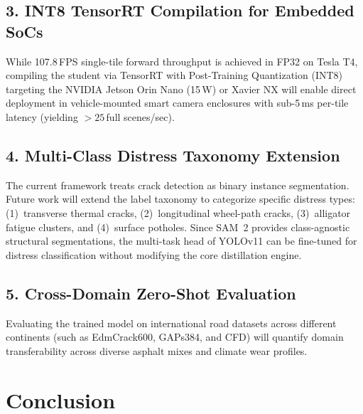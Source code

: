 \documentclass[11pt,a4paper]{article}
\begin{document}
\subsection{3. INT8 TensorRT Compilation for Embedded SoCs}
While 107.8\,FPS single-tile forward throughput is achieved in FP32 on Tesla T4, compiling the student via TensorRT with Post-Training Quantization (INT8) targeting the NVIDIA Jetson Orin Nano (15\,W) or Xavier NX will enable direct deployment in vehicle-mounted smart camera enclosures with sub-5\,ms per-tile latency (yielding $>25$\,full scenes/sec).

\subsection{4. Multi-Class Distress Taxonomy Extension}
The current framework treats crack detection as binary instance segmentation. 
Future work will extend the label taxonomy to categorize specific distress types:
(1)~transverse thermal cracks, (2)~longitudinal wheel-path cracks, (3)~alligator fatigue clusters, and (4)~surface potholes. 
Since SAM~2 provides class-agnostic structural segmentations, the multi-task head of YOLOv11 can be fine-tuned for distress classification without modifying the core distillation engine.

\subsection{5. Cross-Domain Zero-Shot Evaluation}
Evaluating the trained model on international road datasets across different continents (such as EdmCrack600, GAPs384, and CFD) will quantify domain transferability across diverse asphalt mixes and climate wear profiles.

\section{Conclusion}
\label{sec:conclusion}
\end{document}
